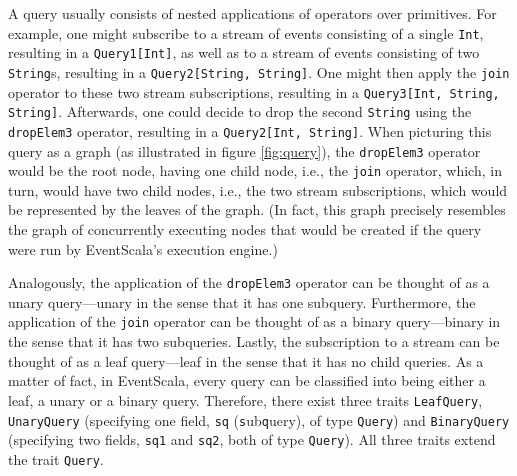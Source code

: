 \documentclass[article, 10pt, type=bsc, colorback, accentcolor=tud8b, parskip=half, bibliography=totocnumbered]{tudthesis}
\begin{document}
A query usually consists of nested applications of operators over primitives.
For example, one might subscribe to a stream of events consisting of a single \lstinline{Int}, resulting in a \lstinline{Query1[Int]}, as well as to a stream of events consisting of two \lstinline{String}s, resulting in a \lstinline{Query2[String, String]}.
One might then apply the \lstinline{join} operator to these two stream subscriptions, resulting in a \lstinline{Query3[Int, String, String]}.
Afterwards, one could decide to drop the second \lstinline{String} using the \lstinline{dropElem3} operator, resulting in a \lstinline{Query2[Int, String]}.
When picturing this query as a graph (as illustrated in figure \ref{fig:query}), the \lstinline{dropElem3} operator would be the root node, having one child node, i.e., the \lstinline{join} operator, which, in turn, would have two child nodes, i.e., the two stream subscriptions, which would be represented by the leaves of the graph.
(In fact, this graph precisely resembles the graph of concurrently executing nodes that would be created if the query were run by EventScala's execution engine.)

Analogously, the application of the \lstinline{dropElem3} operator can be thought of as a unary query---unary in the sense that it has one subquery.
Furthermore, the application of the \lstinline{join} operator can be thought of as a binary query---binary in the sense that it has two subqueries.
Lastly, the subscription to a stream can be thought of as a leaf query---leaf in the sense that it has no child queries.
As a matter of fact, in EventScala, every query can be classified into being either a leaf, a unary or a binary query.
Therefore, there exist three traits \lstinline{LeafQuery}, \lstinline{UnaryQuery} (specifying one field,  \lstinline{sq} (\lstinline{s}ub\lstinline{q}uery), of type \lstinline{Query}) and \lstinline{BinaryQuery} (specifying two fields, \lstinline{sq1} and \lstinline{sq2}, both of type \lstinline{Query}).
All three traits extend the trait \lstinline{Query}.
\end{document}
